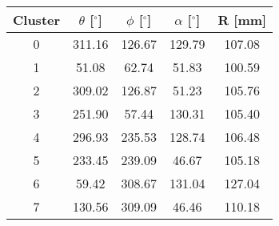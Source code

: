 \begin{tabular}{ccccc}
\hline
Cluster  &  $\theta$ [$^\circ$]  &  $\phi$ [$^\circ$]  &  $\alpha$ [$^\circ$]  &  R [mm]  \\
\hline
0        &  311.16               &  126.67             &  129.79               &  107.08  \\
1        &  51.08                &  62.74              &  51.83                &  100.59  \\
2        &  309.02               &  126.87             &  51.23                &  105.76  \\
3        &  251.90               &  57.44              &  130.31               &  105.40  \\
4        &  296.93               &  235.53             &  128.74               &  106.48  \\
5        &  233.45               &  239.09             &  46.67                &  105.18  \\
6        &  59.42                &  308.67             &  131.04               &  127.04  \\
7        &  130.56               &  309.09             &  46.46                &  110.18  \\
\hline
\end{tabular}
